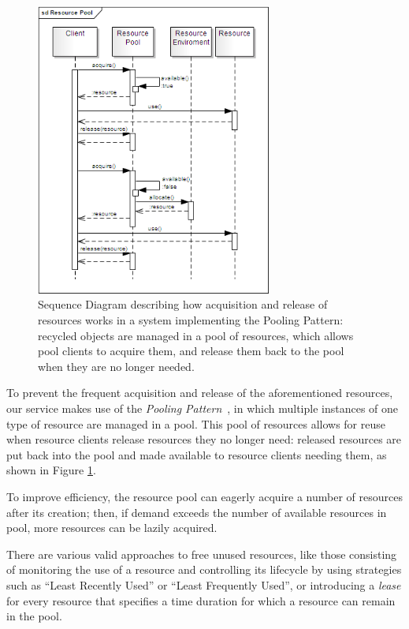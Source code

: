 \documentclass[11pt]{article}
\begin{document}
\begin{figure}[!ht]
\begin{center}
\includegraphics[width=7.75cm]{resource_pool}
\end{center}
\caption{Sequence Diagram describing how acquisition and release of resources works in a system implementing the Pooling Pattern: recycled objects are managed in a pool of resources, which allows pool clients to acquire them, and release them back to the pool when they are no longer needed.}
\label{fig:rp}
\end{figure}

To prevent the frequent acquisition and release of the aforementioned resources, our service makes use of the \emph{Pooling Pattern}~\citep{kircher2001}, in which multiple instances of one type of resource are managed in a pool.  This pool of resources allows for reuse when resource clients release resources they no longer need: released resources are put back into the pool and made available to resource clients needing them, as shown in Figure \ref{fig:rp}.

To improve efficiency, the resource pool can eagerly acquire a number of resources after its creation; then, if demand exceeds the number of available resources in pool, more resources can be lazily acquired.

There are various valid approaches to free unused resources, like those consisting of monitoring the use of a resource and controlling its lifecycle by using  strategies such as ``Least Recently Used'' or ``Least Frequently Used'', or introducing a \emph{lease} for every resource that specifies a time duration for which a resource can remain in the pool.
\end{document}
